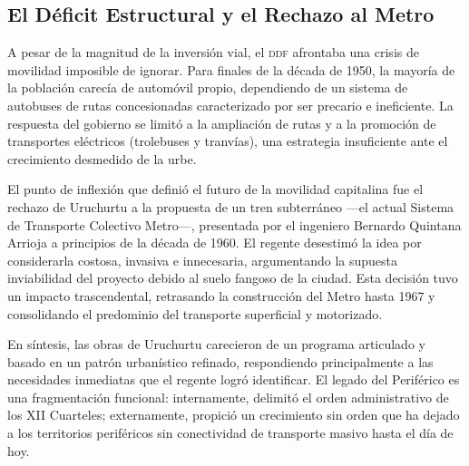 \subsection{El Déficit Estructural y el Rechazo al Metro}
\label{subsec:rechazo-metro}

A pesar de la magnitud de la inversión vial, el \textsc{ddf} afrontaba una
crisis de movilidad imposible de ignorar. Para finales de la década de 1950, la
mayoría de la población carecía de automóvil propio, dependiendo de un sistema
de autobuses de rutas concesionadas caracterizado por ser precario e
ineficiente. La respuesta del gobierno se limitó a la ampliación de rutas y a la
promoción de transportes eléctricos (trolebuses y tranvías), una estrategia
insuficiente ante el crecimiento desmedido de la urbe.

El punto de inflexión que definió el futuro de la movilidad capitalina fue el
rechazo de Uruchurtu a la propuesta de un tren subterráneo ---el actual Sistema
de Transporte Colectivo Metro---, presentada por el ingeniero Bernardo Quintana
Arrioja a principios de la década de 1960. El regente desestimó la idea por
considerarla costosa, invasiva e innecesaria, argumentando la supuesta
inviabilidad del proyecto debido al suelo fangoso de la ciudad. Esta decisión
tuvo un impacto trascendental, retrasando la construcción del Metro hasta 1967 y
consolidando el predominio del transporte superficial y motorizado.

En síntesis, las obras de Uruchurtu carecieron de un programa articulado y
basado en un patrón urbanístico refinado, respondiendo principalmente a las
necesidades inmediatas que el regente logró identificar. El legado del
Periférico es una fragmentación funcional: internamente, delimitó el orden
administrativo de los XII Cuarteles; externamente, propició un crecimiento sin
orden que ha dejado a los territorios periféricos sin conectividad de transporte
masivo hasta el día de hoy.

